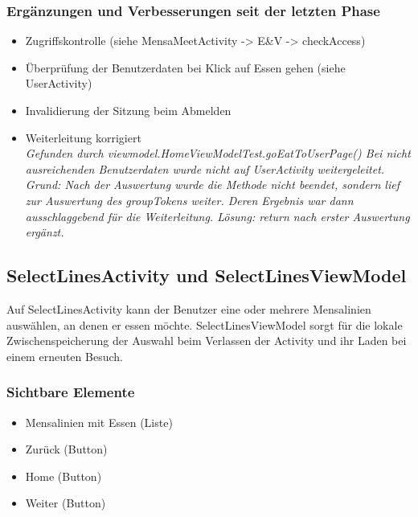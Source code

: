 \documentclass[a4paper]{scrreprt}
\begin{document}
\subsubsection{Ergänzungen und Verbesserungen seit der letzten Phase}
\begin{itemize}
\item Zugriffskontrolle (siehe MensaMeetActivity -> E\&V -> checkAccess)
\item Überprüfung der Benutzerdaten bei Klick auf Essen gehen (siehe UserActivity)
\item Invalidierung der Sitzung beim Abmelden
\item Weiterleitung korrigiert\\
\textit{Gefunden durch viewmodel.HomeViewModelTest.goEatToUserPage() 
Bei nicht ausreichenden Benutzerdaten wurde nicht auf UserActivity weitergeleitet. Grund: Nach der Auswertung wurde die Methode nicht beendet, sondern lief zur Auswertung des groupTokens weiter. Deren Ergebnis war dann ausschlaggebend für die Weiterleitung. Lösung: return nach erster Auswertung ergänzt.}

\end{itemize}

\subsection{SelectLinesActivity und SelectLinesViewModel}
Auf SelectLinesActivity kann der Benutzer eine oder mehrere Mensalinien auswählen, an denen er essen möchte. SelectLinesViewModel sorgt für die lokale Zwischenspeicherung der Auswahl beim Verlassen der Activity und ihr Laden bei einem erneuten Besuch.

\subsubsection{Sichtbare Elemente}
\begin{itemize}
\item Mensalinien mit Essen (Liste)
\item Zurück (Button)
\item Home (Button)
\item Weiter (Button)
\end{itemize}
\end{document}
